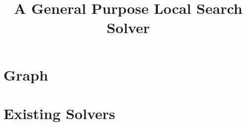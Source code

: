 \documentclass[a4paper,10pt]{article}
\title{A General Purpose Local Search Solver}
\begin{document}
\maketitle

\begin{abstract}

\end{abstract}

\section{Graph}


\section{Existing Solvers}



\end{document}
